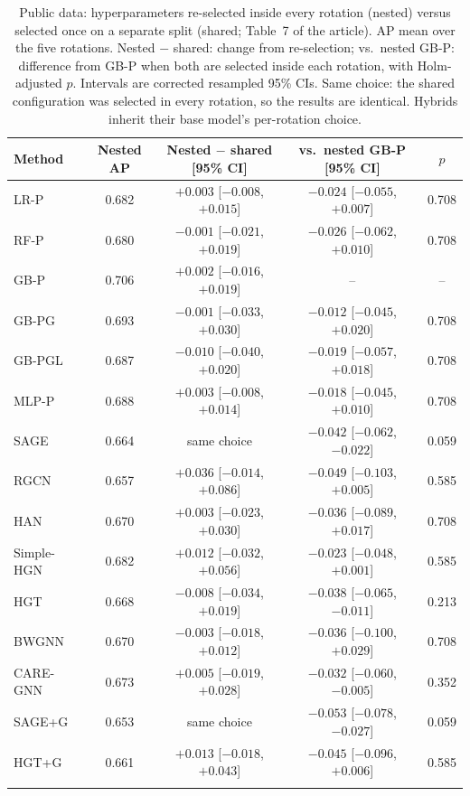 \documentclass[pdflatex,sn-vancouver-num]{sn-jnl}
\newcommand{\MainTabKaggle}{7}
\begin{document}
\begin{table}[h]
\caption{Public data: hyperparameters re-selected inside every rotation (nested) versus selected once on a separate split (shared; Table~\MainTabKaggle{} of the article). AP mean over the five rotations. Nested $-$ shared: change from re-selection; vs.\ nested GB-P: difference from GB-P when both are selected inside each rotation, with Holm-adjusted $p$. Intervals are corrected resampled 95\% CIs. Same choice: the shared configuration was selected in every rotation, so the results are identical. Hybrids inherit their base model's per-rotation choice.}\label{tab:kaggle_nested}
\scriptsize
\setlength{\tabcolsep}{3pt}
\begin{tabular}{@{}lcccc@{}}
\toprule
Method & Nested AP & Nested $-$ shared [95\% CI] & vs.\ nested GB-P [95\% CI] & $p$ \\
\midrule
LR-P & 0.682 & $+0.003$ [$-0.008$, $+0.015$] & $-0.024$ [$-0.055$, $+0.007$] & 0.708 \\
RF-P & 0.680 & $-0.001$ [$-0.021$, $+0.019$] & $-0.026$ [$-0.062$, $+0.010$] & 0.708 \\
GB-P & 0.706 & $+0.002$ [$-0.016$, $+0.019$] & -- & -- \\
GB-PG & 0.693 & $-0.001$ [$-0.033$, $+0.030$] & $-0.012$ [$-0.045$, $+0.020$] & 0.708 \\
GB-PGL & 0.687 & $-0.010$ [$-0.040$, $+0.020$] & $-0.019$ [$-0.057$, $+0.018$] & 0.708 \\
MLP-P & 0.688 & $+0.003$ [$-0.008$, $+0.014$] & $-0.018$ [$-0.045$, $+0.010$] & 0.708 \\
SAGE & 0.664 & same choice & $-0.042$ [$-0.062$, $-0.022$] & 0.059 \\
RGCN & 0.657 & $+0.036$ [$-0.014$, $+0.086$] & $-0.049$ [$-0.103$, $+0.005$] & 0.585 \\
HAN & 0.670 & $+0.003$ [$-0.023$, $+0.030$] & $-0.036$ [$-0.089$, $+0.017$] & 0.708 \\
Simple-HGN & 0.682 & $+0.012$ [$-0.032$, $+0.056$] & $-0.023$ [$-0.048$, $+0.001$] & 0.585 \\
HGT & 0.668 & $-0.008$ [$-0.034$, $+0.019$] & $-0.038$ [$-0.065$, $-0.011$] & 0.213 \\
BWGNN & 0.670 & $-0.003$ [$-0.018$, $+0.012$] & $-0.036$ [$-0.100$, $+0.029$] & 0.708 \\
CARE-GNN & 0.673 & $+0.005$ [$-0.019$, $+0.028$] & $-0.032$ [$-0.060$, $-0.005$] & 0.352 \\
SAGE+G & 0.653 & same choice & $-0.053$ [$-0.078$, $-0.027$] & 0.059 \\
HGT+G & 0.661 & $+0.013$ [$-0.018$, $+0.043$] & $-0.045$ [$-0.096$, $+0.006$] & 0.585 \\
\botrule
\end{tabular}
\end{table}
\end{document}
